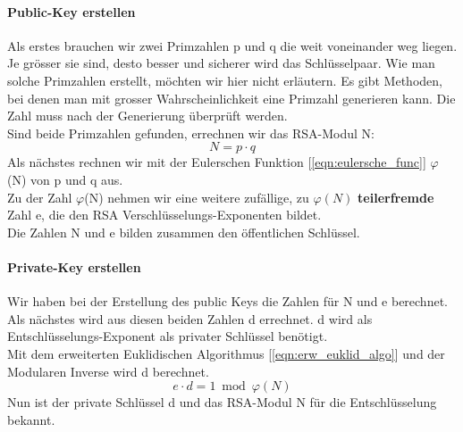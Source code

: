 \paragraph{Public-Key erstellen}\label{sec:public_key}
Als erstes brauchen wir zwei Primzahlen p und q die weit voneinander weg liegen. Je grösser sie sind, desto besser und sicherer wird das Schlüsselpaar. Wie man solche Primzahlen erstellt, möchten wir hier nicht erläutern. Es gibt Methoden, bei denen man mit grosser Wahrscheinlichkeit eine Primzahl generieren kann. Die Zahl muss nach der Generierung überprüft werden.\\
Sind beide Primzahlen gefunden, errechnen wir das RSA-Modul N: %
%
\begin{equation}
  N = p \cdot q
  \label{eqn:rsa_modul}
\end{equation}
%
Als nächstes rechnen wir mit der Eulerschen Funktion [\ref{eqn:eulersche_func}] $\varphi$(N) von p und q aus.\\
Zu der Zahl $\varphi$(N) nehmen wir eine weitere zufällige, zu $\varphi(N)$ \textbf{teilerfremde} Zahl e, die den RSA Verschlüsselungs-Exponenten bildet.\\
Die Zahlen N und e bilden zusammen den öffentlichen Schlüssel.
\paragraph{Private-Key erstellen}
Wir haben bei der Erstellung des public Keys die Zahlen für N und e berechnet. Als nächstes wird aus diesen beiden Zahlen d errechnet. d wird als Entschlüsselungs-Exponent als privater Schlüssel benötigt.\\
Mit dem erweiterten Euklidischen Algorithmus [\ref{eqn:erw_euklid_algo}] und der Modularen Inverse wird d berechnet.\\
\begin{equation}
	e \cdot d = 1 \bmod{ \varphi(N) } 
	\label{eqn:rsa_private_key_erstellen}
\end{equation}
%
%
%
Nun ist der private Schlüssel d und das RSA-Modul N für die Entschlüsselung bekannt.
